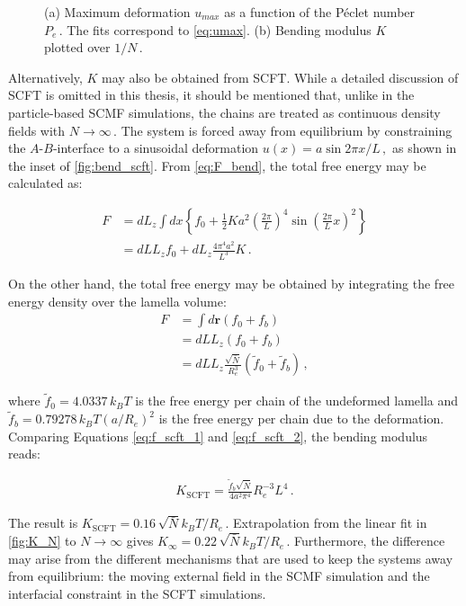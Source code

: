 \documentclass[bachelor,       %
               oneside,        %
               BCOR10mm,       %
               ngerman, english %
               ]{GAUBM}
\begin{document}
\begin{figure}[h]
\begin{subfigure}[b]{0.45\textwidth}
      \caption{}
      \label{fig:K_N}
  \end{subfigure}
     \caption{(a) Maximum deformation $u_{max}$ as a function of the P\'eclet number $P_e\,.$ The fits correspond to \autoref{eq:umax}. (b) Bending modulus $K$ plotted over $1/N\,.$}
\end{figure}


Alternatively, $K$ may also be obtained from \ac{SCFT}. While a detailed discussion of \ac{SCFT} is omitted in this thesis, it should be mentioned that, unlike in the particle-based \ac{SCMF} simulations, the chains are treated as continuous density fields with $N\rightarrow \infty\,.$ The system is forced away from equilibrium by constraining the $A$-$B$-interface to a sinusoidal deformation $u(x)=a\sin 2\pi x/L\,,$ as shown in the inset of \autoref{fig:bend_scft}. From \autoref{eq:F_bend}, the total free energy may be calculated as:

\begin{align}
    F&=dL_z\int dx\left\{f_0+\frac{1}{2}Ka^2\left(\frac{2\pi}{L}\right)^4\sin\left(\frac{2\pi}{L}x\right)^2\right\}\nonumber\\
    &= dLL_zf_0+dL_z\frac{4\pi^4a^2}{L^3}K\,.
    \label{eq:f_scft_1}
\end{align}

On the other hand, the total free energy may be obtained by integrating the free energy density over the lamella volume:
\begin{align}
    F&=\int d\mathbf r(f_0+f_b)\nonumber\\
    &= dLL_z(f_0+f_b)\nonumber \\
    &=dLL_z\frac{\sqrt{\bar N}}{R_e^3}(\tilde f_0+\tilde f_b)\,,
    \label{eq:f_scft_2}
\end{align}

where $\tilde f_0=4.0337\,k_BT$ is the free energy per chain of the undeformed lamella and $\tilde f_b=0.79278\,k_BT(a/R_e)^2$ is the free energy per chain due to the deformation. Comparing Equations \eqref{eq:f_scft_1} and \eqref{eq:f_scft_2}, the bending modulus reads:

\begin{align}
    K_\text{SCFT}=\frac{\tilde f_b\sqrt{\bar N}}{4a^2\pi^4}R_e^{-3}L^4\,.
\end{align}

The result is $K_\text{SCFT}=0.16\,\sqrt{\bar N}k_BT/R_e\,.$ Extrapolation from the linear fit in \autoref{fig:K_N} to $N\rightarrow\infty$ gives $K_\infty=0.22\,\sqrt{\bar N}k_BT/R_e\,.$ Furthermore, the difference may arise from the different mechanisms that are used to keep the systems away from equilibrium: the moving external field in the \ac{SCMF} simulation and the interfacial constraint in the \ac{SCFT} simulations.
\end{document}

